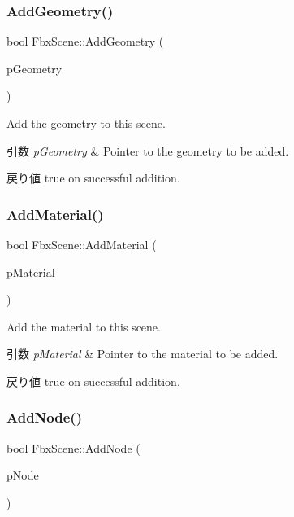 \subsubsection{\texorpdfstring{Add\+Geometry()}{AddGeometry()}}
{\footnotesize\ttfamily bool Fbx\+Scene\+::\+Add\+Geometry (\begin{DoxyParamCaption}\item[{\hyperlink{class_fbx_geometry}{Fbx\+Geometry} $\ast$}]{p\+Geometry }\end{DoxyParamCaption})}

Add the geometry to this scene. 
\begin{DoxyParams}{引数}
{\em p\+Geometry} & Pointer to the geometry to be added. \\
\hline
\end{DoxyParams}
\begin{DoxyReturn}{戻り値}
true on successful addition. 
\end{DoxyReturn}
\mbox{\label{class_fbx_scene_a65586b64256e236b0e0f2d885ca985e2}} 
\subsubsection{\texorpdfstring{Add\+Material()}{AddMaterial()}}
{\footnotesize\ttfamily bool Fbx\+Scene\+::\+Add\+Material (\begin{DoxyParamCaption}\item[{\hyperlink{class_fbx_surface_material}{Fbx\+Surface\+Material} $\ast$}]{p\+Material }\end{DoxyParamCaption})}

Add the material to this scene. 
\begin{DoxyParams}{引数}
{\em p\+Material} & Pointer to the material to be added. \\
\hline
\end{DoxyParams}
\begin{DoxyReturn}{戻り値}
true on successful addition. 
\end{DoxyReturn}
\mbox{\label{class_fbx_scene_a4da84de06d868fd3542f4688834dff6d}} 
\subsubsection{\texorpdfstring{Add\+Node()}{AddNode()}}
{\footnotesize\ttfamily bool Fbx\+Scene\+::\+Add\+Node (\begin{DoxyParamCaption}\item[{\hyperlink{class_fbx_node}{Fbx\+Node} $\ast$}]{p\+Node }\end{DoxyParamCaption})}

